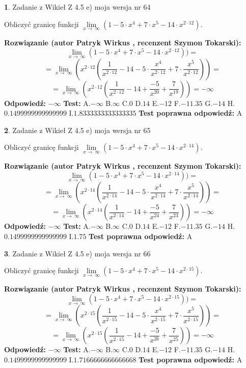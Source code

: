 \documentclass[12pt, a4paper]{article}
\theoremstyle{definition} %
\newtheorem{zad}{}
\newcommand{\zadStart}[1]{\begin{zad}#1\newline}
\newcommand{\zadStop}{\end{zad}}
\newcommand{\rozwStart}[2]{\noindent \textbf{Rozwiązanie (autor #1 , recenzent #2): }\newline}
\newcommand{\rozwStop}{\newline}
\newcommand{\odpStart}{\noindent \textbf{Odpowiedź:}\newline}
\newcommand{\odpStop}{\newline}
\newcommand{\testStart}{\noindent \textbf{Test:}\newline}
\newcommand{\testStop}{\newline}
\newcommand{\kluczStart}{\noindent \textbf{Test poprawna odpowiedź:}\newline}
\newcommand{\kluczStop}{\newline}
\begin{document}
\zadStart{Zadanie z Wikieł Z 4.5 e) moja wersja nr 64}


Obliczyć granicę funkcji  $\lim\limits_{x\to\ \infty}(1 - 5 \cdot x^{4}+7 \cdot x^{5}- 14 \cdot x^{2\cdot12})$.
\zadStop
\rozwStart{Patryk Wirkus}{Szymon Tokarski}
$$\lim\limits_{x\to\ \infty}(1 - 5 \cdot x^{4}+7 \cdot x^{5}- 14 \cdot x^{2\cdot12}))=$$
$$=\lim\limits_{x\to\ \infty}(x^{2\cdot12}(\frac{1}{x^{2\cdot12}}-14 -5 \cdot \frac{x^{4}}{x^{2\cdot12}}+7 \cdot \frac{x^{5}}{x^{2\cdot12}}))=$$
$$=\lim\limits_{x\to\ \infty}(x^{2\cdot12}(\frac{1}{x^{2\cdot12}}-14 + \frac{-5}{x^{20}}+ \frac{7}{x^{19}}))=-\infty$$
\rozwStop
\odpStart
$-\infty$
\odpStop
\testStart
A.$-\infty$ B.$\infty$ C.$0$ D.$14$ E.$-12$
F.$-11.35$ G.$-14$
H.$0.1499999999999999$
I.$1.8333333333333335$
\testStop
\kluczStart
A
\kluczStop



\zadStart{Zadanie z Wikieł Z 4.5 e) moja wersja nr 65}


Obliczyć granicę funkcji  $\lim\limits_{x\to\ \infty}(1 - 5 \cdot x^{4}+7 \cdot x^{5}- 14 \cdot x^{2\cdot14})$.
\zadStop
\rozwStart{Patryk Wirkus}{Szymon Tokarski}
$$\lim\limits_{x\to\ \infty}(1 - 5 \cdot x^{4}+7 \cdot x^{5}- 14 \cdot x^{2\cdot14}))=$$
$$=\lim\limits_{x\to\ \infty}(x^{2\cdot14}(\frac{1}{x^{2\cdot14}}-14 -5 \cdot \frac{x^{4}}{x^{2\cdot14}}+7 \cdot \frac{x^{5}}{x^{2\cdot14}}))=$$
$$=\lim\limits_{x\to\ \infty}(x^{2\cdot14}(\frac{1}{x^{2\cdot14}}-14 + \frac{-5}{x^{24}}+ \frac{7}{x^{23}}))=-\infty$$
\rozwStop
\odpStart
$-\infty$
\odpStop
\testStart
A.$-\infty$ B.$\infty$ C.$0$ D.$14$ E.$-12$
F.$-11.35$ G.$-14$
H.$0.1499999999999999$
I.$1.75$
\testStop
\kluczStart
A
\kluczStop



\zadStart{Zadanie z Wikieł Z 4.5 e) moja wersja nr 66}


Obliczyć granicę funkcji  $\lim\limits_{x\to\ \infty}(1 - 5 \cdot x^{4}+7 \cdot x^{5}- 14 \cdot x^{2\cdot15})$.
\zadStop
\rozwStart{Patryk Wirkus}{Szymon Tokarski}
$$\lim\limits_{x\to\ \infty}(1 - 5 \cdot x^{4}+7 \cdot x^{5}- 14 \cdot x^{2\cdot15}))=$$
$$=\lim\limits_{x\to\ \infty}(x^{2\cdot15}(\frac{1}{x^{2\cdot15}}-14 -5 \cdot \frac{x^{4}}{x^{2\cdot15}}+7 \cdot \frac{x^{5}}{x^{2\cdot15}}))=$$
$$=\lim\limits_{x\to\ \infty}(x^{2\cdot15}(\frac{1}{x^{2\cdot15}}-14 + \frac{-5}{x^{26}}+ \frac{7}{x^{25}}))=-\infty$$
\rozwStop
\odpStart
$-\infty$
\odpStop
\testStart
A.$-\infty$ B.$\infty$ C.$0$ D.$14$ E.$-12$
F.$-11.35$ G.$-14$
H.$0.1499999999999999$
I.$1.7166666666666668$
\testStop
\kluczStart
A
\kluczStop
\end{document}
